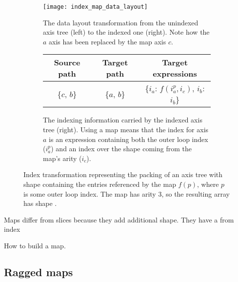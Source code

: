 \documentclass[thesis]{subfiles}
\begin{document}
\begin{figure}[h]
  \centering
  \begin{subfigure}{\textwidth}
    \centering
    \texttt{[image: index\_map\_data\_layout]}
    \caption{
      The data layout transformation from the unindexed axis tree (left) to the indexed one (right).
      Note how the $a$ axis has been replaced by the map axis $c$.
    }
    \label{fig:index_map_data_layout}
  \end{subfigure}

  \vspace{1em}

  \begin{subfigure}{\textwidth}
    \centering
    \begin{tabular}{|c|c|c|}
      \hline
      \textbf{Source path} & \textbf{Target path} & \textbf{Target expressions} \\
      \hline
      \{$c$, $b$\} & \{$a$, $b$\} & \{$i_a$: $f(i^p_a, i_c)$, $i_b$: $i_b$\} \\
      \hline
    \end{tabular}
    \caption{
      The indexing information carried by the indexed axis tree (right).
      Using a map means that the index for axis $a$ is an expression containing both the outer loop index ($i^p_a$) and an index over the shape coming from the map's arity ($i_c$).
    }
    \label{fig:index_map_data_layout_exprs}
  \end{subfigure}

  \caption{
    Index transformation representing the packing of an axis tree with shape  containing the entries referenced by the map $f(p)$, where $p$ is some outer loop index.
    The map has arity 3, so the resulting array has shape .
  }
  \label{fig:index_map_data_layout_all}
\end{figure}

Maps differ from slices because they add additional shape. They have a from index

How to build a map.



\subsection{Ragged maps}
\end{document}

